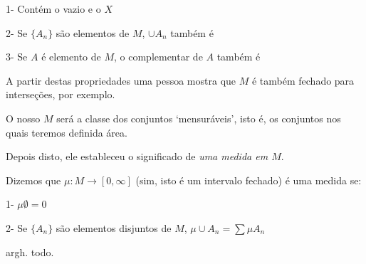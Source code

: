 \documentclass{article}
\begin{document}
1- Contém o vazio e o $X$

2- Se $\{A_n\}$ são elementos de $M$, $\cup A_n$ também é

3- Se $A$ é elemento de $M$, o complementar de $A$ também é

A partir destas propriedades uma pessoa mostra que $M$ é também fechado para interseções, por exemplo.

O nosso $M$ será a classe dos conjuntos `mensuráveis', isto é, os conjuntos nos quais teremos definida área.

Depois disto, ele estableceu o significado de \emph{uma medida em $M$}.

Dizemos que $\mu : M \to [0, \infty]$ (sim, isto é um intervalo fechado) é uma medida se:

1- $\mu \emptyset = 0$

2- Se $\{A_n\}$ são elementos disjuntos de $M$, $\mu \cup A_n = \sum \mu A_n$

argh. todo.
\end{document}
